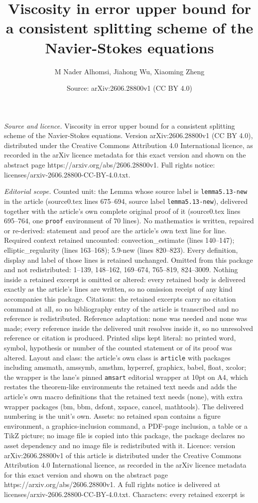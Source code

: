 \documentclass[10pt,a4paper]{amsart}
\title[Viscosity in error upper bound for a consistent splitting sc]{Viscosity in error upper bound for a consistent splitting scheme of the Navier-Stokes equations}
\author{M Nader Alhomsi, Jiahong Wu, Xiaoming Zheng}
\date{Source: arXiv:2606.28800v1 (CC BY 4.0)}
\begin{document}
\maketitle

\noindent\emph{Source and licence.} Viscosity in error upper bound for a consistent splitting scheme of the Navier-Stokes equations. Version arXiv:2606.28800v1 (CC BY 4.0), distributed under the Creative Commons Attribution 4.0 International licence, as recorded in the arXiv licence metadata for this exact version and shown on the abstract page https://arxiv.org/abs/2606.28800v1. Full rights notice: licenses/arxiv-2606.28800-CC-BY-4.0.txt.\par\smallskip

\noindent\textit{Editorial scope.} Counted unit: the Lemma whose source label is \texttt{lemma5.13-new} in the article (source0.tex lines 675--694, source label \texttt{lemma5.13-new}), delivered together with the article's own complete original proof of it (source0.tex lines 695--764, one \texttt{proof} environment of 70 lines). No mathematics is written, repaired or re-derived: statement and proof are the article's own text line for line. Required context retained uncounted: convection\_estimate (lines 140--147); elliptic\_regularity (lines 163--168); 5.9-new (lines 820--823). Every definition, display and label of those lines is retained unchanged. Omitted from this package and not redistributed: 1--139, 148--162, 169--674, 765--819, 824--3009. Nothing inside a retained excerpt is omitted or altered: every retained body is delivered exactly as the article's lines are written, so no omission receipt of any kind accompanies this package. Citations: the retained excerpts carry no citation command at all, so no bibliography entry of the article is transcribed and no reference is redistributed. Reference adaptation: none was needed and none was made; every reference inside the delivered unit resolves inside it, so no unresolved reference or citation is produced. Printed slips kept literal: no printed word, symbol, hypothesis or number of the counted statement or of its proof was altered. Layout and class: the article's own class is \texttt{article} with packages including amsmath, amssymb, amsthm, hyperref, graphicx, babel, float, xcolor; the wrapper is the lane's pinned \texttt{amsart} editorial wrapper at 10pt on A4, which restates the theorem-like environments the retained text needs and adds the article's own macro definitions that the retained text needs (none), with extra wrapper packages (bm, bbm, dsfont, xspace, cancel, mathtools). The delivered numbering is the unit's own. Assets: no retained span contains a figure environment, a graphics-inclusion command, a PDF-page inclusion, a table or a TikZ picture; no image file is copied into this package, the package declares no asset dependency and no image file is redistributed with it. Licence: version arXiv:2606.28800v1 of this article is distributed under the Creative Commons Attribution 4.0 International licence, as recorded in the arXiv licence metadata for this exact version and shown on the abstract page https://arxiv.org/abs/2606.28800v1. A full rights notice is delivered at licenses/arxiv-2606.28800-CC-BY-4.0.txt. Characters: every retained excerpt is 
\end{document}
